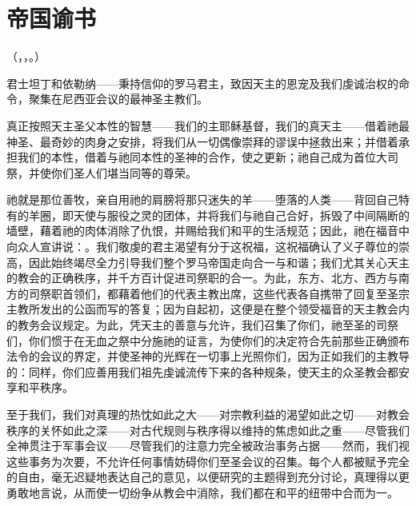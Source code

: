 
\section{帝国谕书}

\par

（，，。）\par

君士坦丁和依勒纳——秉持信仰的罗马君主，致因天主的恩宠及我们虔诚治权的命令，聚集在尼西亚会议的最神圣主教们。\par

真正按照天主圣父本性的智慧——我们的主耶稣基督，我们的真天主——借着祂最神圣、最奇妙的肉身之安排，将我们从一切偶像崇拜的谬误中拯救出来；并借着承担我们的本性，借着与祂同本性的圣神的合作，使之更新；祂自己成为首位大司祭，并使你们圣人们堪当同等的尊荣。\par

祂就是那位善牧，亲自用祂的肩膀将那只迷失的羊——堕落的人类——背回自己特有的羊圈，即天使与服役之灵的团体，并将我们与祂自己合好，拆毁了中间隔断的墙壁，藉着祂的肉体消除了仇恨，并赐给我们和平的生活规范；因此，祂在福音中向众人宣讲说：。我们敬虔的君主渴望有分于这祝福，这祝福确认了义子尊位的崇高，因此始终竭尽全力引导我们整个罗马帝国走向合一与和谐；我们尤其关心天主的教会的正确秩序，并千方百计促进司祭职的合一。为此，东方、北方、西方与南方的司祭职首领们，都藉着他们的代表主教出席，这些代表各自携带了回复至圣宗主教所发出的公函而写的答复；因为自起初，这便是在整个领受福音的天主教会内的教务会议规定。为此，凭天主的善意与允许，我们召集了你们，祂至圣的司祭们，你们惯于在无血之祭中分施祂的证言，为使你们的决定符合先前那些正确颁布法令的会议的界定，并使圣神的光辉在一切事上光照你们，因为正如我们的主教导的：同样，你们应善用我们祖先虔诚流传下来的各种规条，使天主的众圣教会都安享和平秩序。\par

至于我们，我们对真理的热忱如此之大——对宗教利益的渴望如此之切——对教会秩序的关怀如此之深——对古代规则与秩序得以维持的焦虑如此之重——尽管我们全神贯注于军事会议——尽管我们的注意力完全被政治事务占据——然而，我们视这些事务为次要，不允许任何事情妨碍你们至圣会议的召集。每个人都被赋予完全的自由，毫无迟疑地表达自己的意见，以便研究的主题得到充分讨论，真理得以更勇敢地言说，从而使一切纷争从教会中消除，我们都在和平的纽带中合而为一。\par

